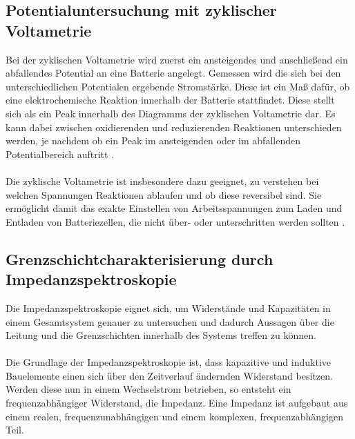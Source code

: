 \documentclass[a4paper, 11pt, headsepline,footsepline,twoside,abstract]{scrbook}
\begin{document}
\subsection{Potentialuntersuchung mit zyklischer Voltametrie}
Bei der zyklischen Voltametrie wird zuerst ein ansteigendes und anschließend ein abfallendes Potential an eine Batterie angelegt. Gemessen wird die sich bei den unterschiedlichen Potentialen ergebende Stromstärke. Diese ist ein Maß dafür, ob eine elektrochemische Reaktion innerhalb der Batterie stattfindet. Diese stellt sich als ein Peak innerhalb des Diagramms der zyklischen Voltametrie dar. Es kann dabei zwischen oxidierenden und reduzierenden Reaktionen unterschieden werden, je nachdem ob ein Peak im ansteigenden oder im abfallenden Potentialbereich auftritt \cite{Hamann2005}.
\\\\
Die zyklische Voltametrie ist insbesondere dazu geeignet, zu verstehen bei welchen Spannungen Reaktionen ablaufen und ob diese reversibel sind. Sie ermöglicht damit das exakte Einstellen von Arbeitsspannungen zum Laden und Entladen von Batteriezellen, die nicht über- oder unterschritten werden sollten \cite{Linden2011}.
\subsection{Grenzschichtcharakterisierung durch Impedanzspektroskopie}
Die Impedanzspektroskopie eignet sich, um Widerstände und Kapazitäten in einem Gesamtsystem genauer zu untersuchen und dadurch Aussagen über die Leitung und die Grenzschichten innerhalb des Systems treffen zu können.
\\\\
Die Grundlage der Impedanzspektroskopie ist, dass kapazitive und induktive Bauelemente einen sich über den Zeitverlauf ändernden Widerstand besitzen. Werden diese nun in einem Wechselstrom betrieben, so entsteht ein frequenzabhängiger Widerstand, die Impedanz. Eine Impedanz ist aufgebaut aus einem realen, frequenz\-unabhängigen und einem komplexen, frequenz\-abhängigen Teil.
\end{document}

